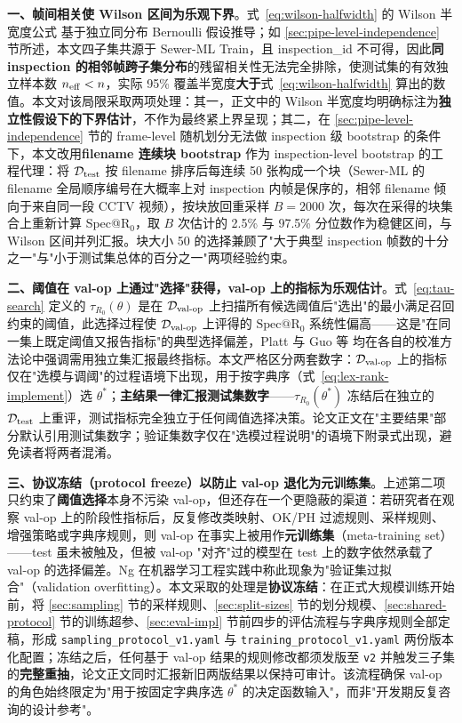 \documentclass[UTF8,openany,12pt]{ctexbook}
\begin{document}
\textbf{一、帧间相关使 Wilson 区间为乐观下界}。式~\eqref{eq:wilson-halfwidth} 的 Wilson 半宽度公式\cite{wilson1927probable} 基于独立同分布 Bernoulli 假设推导；如 \ref{sec:pipe-level-independence} 节所述，本文四子集共源于 Sewer-ML Train，且 inspection\_id 不可得，因此\textbf{同 inspection 的相邻帧跨子集分布}的残留相关性无法完全排除，使测试集的有效独立样本数 $n_{\rm eff} < n$，实际 95\% 覆盖半宽度\textbf{大于}式~\eqref{eq:wilson-halfwidth} 算出的数值。本文对该局限采取两项处理：其一，正文中的 Wilson 半宽度均明确标注为\textbf{独立性假设下的下界估计}，不作为最终紧上界呈现；其二，在 \ref{sec:pipe-level-independence} 节的 frame-level 随机划分无法做 inspection 级 bootstrap 的条件下，本文改用\textbf{filename 连续块 bootstrap}\cite{kunsch1989jackknife} 作为 inspection-level bootstrap 的工程代理：将 $\mathcal{D}_{\rm test}$ 按 filename 排序后每连续 50 张构成一个块（Sewer-ML 的 filename 全局顺序编号在大概率上对 inspection 内帧是保序的，相邻 filename 倾向于来自同一段 CCTV 视频），按块放回重采样 $B = 2000$ 次，每次在采得的块集合上重新计算 Spec@R$_0$，取 $B$ 次估计的 2.5\% 与 97.5\% 分位数作为稳健区间，与 Wilson 区间并列汇报。块大小 50 的选择兼顾了"大于典型 inspection 帧数的十分之一"与"小于测试集总体的百分之一"两项经验约束。

\textbf{二、阈值在 val-op 上通过"选择"获得，val-op 上的指标为乐观估计}。式~\eqref{eq:tau-search} 定义的 $\tau_{R_0}(\theta)$ 是在 $\mathcal{D}_{\rm val\text{-}op}$ 上扫描所有候选阈值后"选出"的最小满足召回约束的阈值，此选择过程使 $\mathcal{D}_{\rm val\text{-}op}$ 上评得的 $\mathrm{Spec@R_0}$ 系统性偏高——这是"在同一集上既定阈值又报告指标"的典型选择偏差，Platt\cite{platt1999probabilistic} 与 Guo 等\cite{guo2017calibration} 均在各自的校准方法论中强调需用独立集汇报最终指标。本文严格区分两套数字：$\mathcal{D}_{\rm val\text{-}op}$ 上的指标仅在"选模与调阈"的过程语境下出现，用于按字典序（式~\eqref{eq:lex-rank-implement}）选 $\theta^{\ast}$；\textbf{主结果一律汇报测试集数字}——$\tau_{R_0}(\theta^{\ast})$ 冻结后在独立的 $\mathcal{D}_{\rm test}$ 上重评，测试指标完全独立于任何阈值选择决策。论文正文在"主要结果"部分默认引用测试集数字；验证集数字仅在"选模过程说明"的语境下附录式出现，避免读者将两者混淆。

\textbf{三、协议冻结（protocol freeze）以防止 val-op 退化为元训练集}。上述第二项只约束了\textbf{阈值选择}本身不污染 val-op，但还存在一个更隐蔽的渠道：若研究者在观察 val-op 上的阶段性指标后，反复修改类映射、OK/PH 过滤规则、采样规则、增强策略或字典序规则，则 val-op 在事实上被用作\textbf{元训练集}（meta-training set）——test 虽未被触及，但被 val-op "对齐"过的模型在 test 上的数字依然承载了 val-op 的选择偏差。Ng\cite{ng2017machine} 在机器学习工程实践中称此现象为"验证集过拟合"（validation overfitting）。本文采取的处理是\textbf{协议冻结}：在正式大规模训练开始前，将 \ref{sec:sampling} 节的采样规则、\ref{sec:split-sizes} 节的划分规模、\ref{sec:shared-protocol} 节的训练超参、\ref{sec:eval-impl} 节前四步的评估流程与字典序规则全部定稿，形成 \texttt{sampling\_protocol\_v1.yaml} 与 \texttt{training\_protocol\_v1.yaml} 两份版本化配置；冻结之后，任何基于 val-op 结果的规则修改都须发版至 \texttt{v2} 并触发三子集的\textbf{完整重抽}，论文正文同时汇报新旧两版结果以保持可审计。该流程确保 val-op 的角色始终限定为"用于按固定字典序选 $\theta^{\ast}$ 的决定函数输入"，而非"开发期反复咨询的设计参考"。
\end{document}
